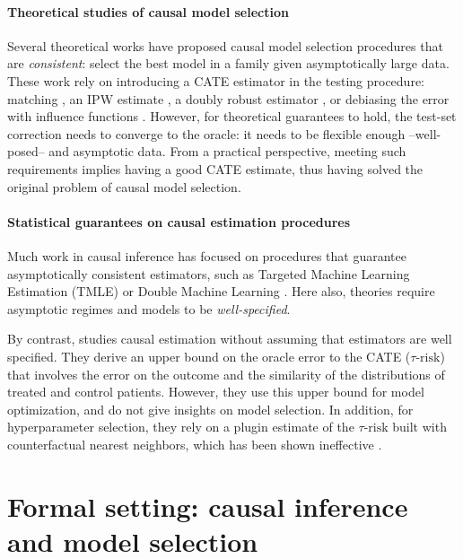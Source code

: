 \documentclass{report}
\begin{document}
\paragraph{Theoretical studies of causal model selection}

Several theoretical works have proposed causal model selection procedures
that are \emph{consistent}: select the best model in a family given
asymptotically large data. These work rely on introducing a
CATE estimator in the testing procedure: matching
\citep{rolling_model_2014}, an IPW estimate
\citep{gutierrez_causal_2016}, a doubly robust estimator
\citep{saito_counterfactual_2020}, or debiasing the error with influence
functions \citep{alaa_validating_2019}. However, for theoretical
guarantees to hold, the test-set correction needs to converge to the
oracle: it needs to be flexible enough --well-posed-- and asymptotic
data. From a practical perspective, meeting such requirements
implies having a good CATE estimate, thus having solved
the original problem of causal model selection.

\paragraph{Statistical guarantees on causal estimation procedures}

Much work in causal inference has focused on procedures that
guarantee asymptotically consistent estimators, such as Targeted
Machine Learning
Estimation (TMLE) \citep{laan_targeted_2011,schuler_targeted_2017} or
Double Machine Learning \citep{chernozhukov_double_2018}. Here also, theories require asymptotic regimes and
models to be \textit{well-specified}.

By contrast, \citet{johansson2022generalization} studies causal estimation
without assuming that estimators are well specified. They derive an upper bound
on the oracle error to the CATE ($\tau\text{-risk}$) that involves the error on
the outcome and the similarity of the distributions of treated and control
patients. However, they use this upper bound for model optimization,
and do not give insights on model selection. In addition, for hyperparameter
selection, they rely on a plugin estimate of the $\tau\text{-risk}$ built with
counterfactual nearest neighbors, which has been shown ineffective
\citep{schuler_comparison_2018}.

\section{Formal setting: causal inference and model selection}%
\label{sec:causal_model_selection:setting}%
\end{document}
